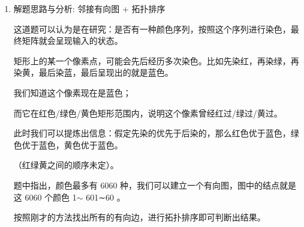 \documentclass[9pt, b5paaper]{book}
\begin{document}
\begin{enumerate}
\item 解题思路与分析: 邻接有向图 + 拓扑排序
\label{sec-1-5-4-1}

这道题可以认为是在研究：是否有一种颜色序列，按照这个序列进行染色，最终矩阵就会呈现输入的状态。

矩形上的某一个像素点，可能会先后经历多次染色。比如先染红，再染绿，再染黄，最后染蓝，最后呈现出的就是蓝色。

我们知道这个像素现在是蓝色；

而它在红色/绿色/黄色矩形范围内，说明这个像素曾经红过/绿过/黄过。

此时我们可以提炼出信息：假定先染的优先于后染的，那么红色优于蓝色，绿色优于蓝色，黄色优于蓝色。

（红绿黄之间的顺序未定）。

题中指出，颜色最多有 6060 种，我们可以建立一个有向图，图中的结点就是这 6060 个颜色 1$\sim$ 601∼60 。

按照刚才的方法找出所有的有向边，进行拓扑排序即可判断出结果。


\end{enumerate}
\end{document}
